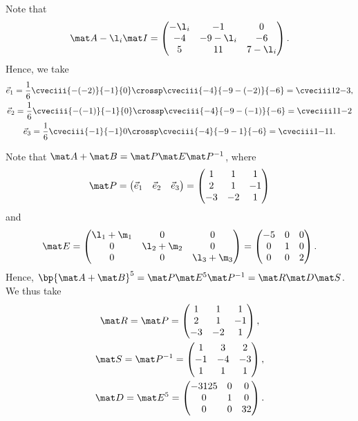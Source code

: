 \begin{solution}
\begin{ppart}
\begin{psubpart}
            Note that \[\mat A - \l_i \mat I = \begin{pmatrix}-\l_i & -1 & 0 \\ -4 & -9 - \l_i & -6 \\ 5 & 11 & 7 - \l_i\end{pmatrix}.\] Hence, we take
            \begin{gather*}
                \vec e_1 = \frac16 \cveciii{- (-2)}{-1}{0} \crossp \cveciii{-4}{-9 - (-2)}{-6} = \cveciii12{-3},\\
                \vec e_2 = \frac16 \cveciii{- (-1)}{-1}{0} \crossp \cveciii{-4}{-9 - (-1)}{-6} = \cveciii11{-2}\\
                \vec e_3 = \frac16 \cveciii{-1}{-1}0 \crossp \cveciii{-4}{-9 - 1}{-6} = \cveciii1{-1}1.
            \end{gather*}
        \end{psubpart}
        \begin{psubpart}
            Note that $\mat A + \mat B = \mat P \mat E \mat P^{-1}$, where \[\mat P = \begin{pmatrix}\vec e_1 & \vec e_2 & \vec e_3 \end{pmatrix} = \begin{pmatrix}1 & 1 & 1 \\ 2 & 1 & -1 \\ -3 & -2 & 1\end{pmatrix}\] and \[\mat E = \begin{pmatrix}\l_1 + \m_1 & 0 & 0 \\ 0 & \l_2 + \m_2 & 0 \\ 0 & 0 & \l_3 + \m_3\end{pmatrix} = \begin{pmatrix}-5 & 0 & 0 \\ 0 & 1 & 0 \\ 0 & 0 & 2\end{pmatrix}.\] Hence, $\bp{\mat A + \mat B}^5 = \mat P \mat E^5 \mat P^{-1} = \mat R \mat D \mat S$. We thus take
            \begin{gather*}
                \mat R = \mat P = \begin{pmatrix}1 & 1 & 1 \\ 2 & 1 & -1 \\ -3 & -2 & 1\end{pmatrix},\\
                \mat S = \mat P^{-1} = \begin{pmatrix}1 & 3 & 2 \\ -1 & -4 & -3 \\ 1 & 1 & 1\end{pmatrix},\\
                \mat D = \mat E^5 = \begin{pmatrix}-3125 & 0 & 0 \\ 0 & 1 & 0 \\ 0 & 0 & 32\end{pmatrix}.
            \end{gather*}
        \end{psubpart}
    \end{ppart}
\end{solution}

